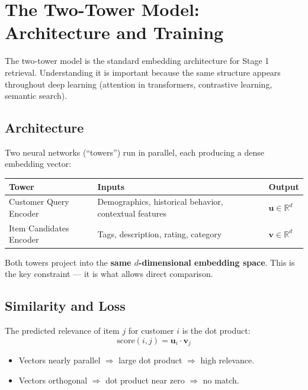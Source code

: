 \documentclass[11pt]{article}
\begin{document}
\section{The Two-Tower Model: Architecture and Training}

The two-tower model is the standard embedding architecture for Stage 1
retrieval. Understanding it is important because the same structure appears
throughout deep learning (attention in transformers, contrastive learning,
semantic search).

\subsection{Architecture}
Two neural networks (``towers'') run in parallel, each producing a
dense embedding vector:

\begin{center}
\begin{tabular}{@{}lll@{}}
\toprule
\textbf{Tower} & \textbf{Inputs} & \textbf{Output} \\
\midrule
Customer Query Encoder & Demographics, historical behavior, contextual features & $\mathbf{u} \in \mathbb{R}^d$ \\
Item Candidates Encoder & Tags, description, rating, category & $\mathbf{v} \in \mathbb{R}^d$ \\
\bottomrule
\end{tabular}
\end{center}

Both towers project into the \textbf{same $d$-dimensional embedding space}.
This is the key constraint --- it is what allows direct comparison.

\subsection{Similarity and Loss}
The predicted relevance of item $j$ for customer $i$ is the dot product:
\[
\text{score}(i, j) = \mathbf{u}_i \cdot \mathbf{v}_j
\]
\begin{itemize}
    \item Vectors nearly parallel $\Rightarrow$ large dot product $\Rightarrow$
      high relevance.
    \item Vectors orthogonal $\Rightarrow$ dot product near zero $\Rightarrow$
      no match.
\end{itemize}
\end{document}
